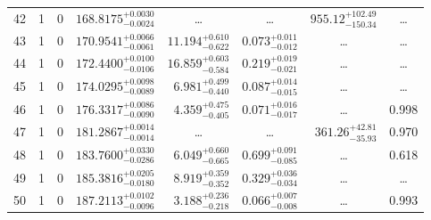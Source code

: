 \begin{table*}[!]
\begin{tabular}{llcrrlrc}
42 & 1 & 0 & $    168.8175_{-      0.0024}^{+      0.0030}$ & \multicolumn{1}{c}{\dots} & \multicolumn{1}{c}{\dots} & $      955.12_{-      150.34}^{+      102.49}$ & \dots \\[1pt]
43 & 1 & 0 & $    170.9541_{-      0.0061}^{+      0.0066}$ & $      11.194_{-       0.622}^{+       0.610}$ & $       0.073_{-       0.012}^{+       0.011}$ & \multicolumn{1}{c}{\dots} & \dots \\[1pt]
44 & 1 & 0 & $    172.4400_{-      0.0106}^{+      0.0100}$ & $      16.859_{-       0.584}^{+       0.603}$ & $       0.219_{-       0.021}^{+       0.019}$ & \multicolumn{1}{c}{\dots} & \dots \\[1pt]
45 & 1 & 0 & $    174.0295_{-      0.0089}^{+      0.0098}$ & $       6.981_{-       0.440}^{+       0.499}$ & $       0.087_{-       0.015}^{+       0.014}$ & \multicolumn{1}{c}{\dots} & \dots \\[1pt]
46 & 1 & 0 & $    176.3317_{-      0.0090}^{+      0.0086}$ & $       4.359_{-       0.405}^{+       0.475}$ & $       0.071_{-       0.017}^{+       0.016}$ & \multicolumn{1}{c}{\dots} & 0.998\\[1pt]

47 & 1 & 0 & $    181.2867_{-      0.0014}^{+      0.0014}$ & \multicolumn{1}{c}{\dots} & \multicolumn{1}{c}{\dots} & $      361.26_{-       35.93}^{+       42.81}$ & 0.970\\[1pt]
48 & 1 & 0 & $    183.7600_{-      0.0286}^{+      0.0330}$ & $       6.049_{-       0.665}^{+       0.660}$ & $       0.699_{-       0.085}^{+       0.091}$ & \multicolumn{1}{c}{\dots} & 0.618\\[1pt]
49 & 1 & 0 & $    185.3816_{-      0.0180}^{+      0.0205}$ & $       8.919_{-       0.352}^{+       0.359}$ & $       0.329_{-       0.034}^{+       0.036}$ & \multicolumn{1}{c}{\dots} & \dots \\[1pt]
50 & 1 & 0 & $    187.2113_{-      0.0096}^{+      0.0102}$ & $       3.188_{-       0.218}^{+       0.236}$ & $       0.066_{-       0.008}^{+       0.007}$ & \multicolumn{1}{c}{\dots} & 0.993\\[1pt]


\hline
\end{tabular}
\end{table*}



